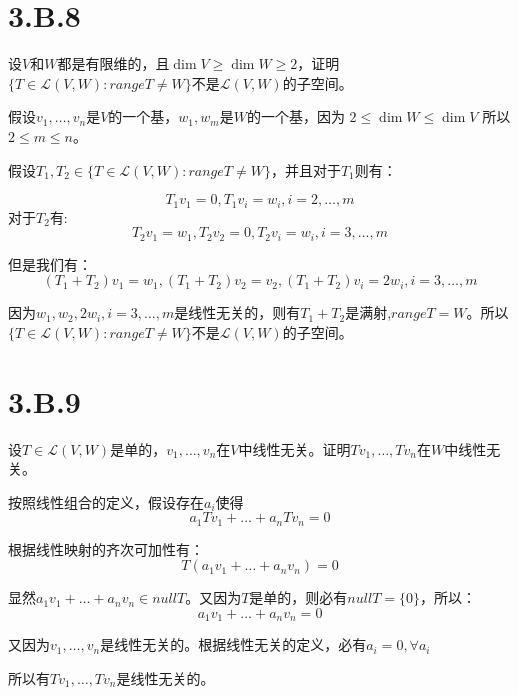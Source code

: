 \documentclass[10pt,a4paper,UTF8]{article}
\begin{document}
\section{3.B.8}
\label{sec:orgcf3ce95}


\begin{problem}
设\(V\)和\(W\)都是有限维的，且\(\dim V \geq \dim W \geq 2\)，证明\(\{T\in \mathcal{L}(V,W): range T \neq W\}\)不是\(\mathcal{L}(V,W)\)的子空间。
\end{problem}

\begin{answer}
假设\(v_{1},\ldots ,v_{n}\)是\(V\)的一个基，\(w_{1},w_{m}\)是\(W\)的一个基，因为 \(2\leq \dim W \leq \dim V\) 所以\(2\leq m \leq n\)。

假设\(T_{1},T_{2}\in \{T\in \mathcal{L}(V,W): range T \neq W\}\)，并且对于\(T_{1}\)则有：

\begin{equation}
\label{eq:12}
T_{1}v_{1} = 0, T_{1}v_{i} = w_{i}, i = 2,\ldots ,m
\end{equation}
对于\(T_{2}\)有:
\begin{equation}
\label{eq:13}
T_{2}v_{1} = w_{1}, T_{2}v_{2} = 0, T_{2}v_{i}= w_{i}, i = 3,\ldots ,m
\end{equation}

但是我们有：
\begin{equation}
\label{eq:14}
(T_{1} + T_{2}) v_{1} = w_{1}, (T_{1} + T_{2}) v_{2} = v_{2}, (T_{1} + T_{2})v_{i} = 2w_{i}, i = 3,\ldots ,m
\end{equation}


因为\(w_{1},w_{2},2w_{i},i=3,\ldots ,m\)是线性无关的，则有\(T_{1}+T_{2}\)是满射,\(rangeT = W\)。所以\(\{T\in \mathcal{L}(V,W): range T \neq W\}\)不是\(\mathcal{L}(V,W)\)的子空间。
\end{answer}
\section{3.B.9}
\label{sec:org2029a39}


\begin{problem}
设\(T\in \mathcal{L}(V,W)\)是单的，\(v_{1},\ldots ,v_{n}\)在\(V\)中线性无关。证明\(Tv_{1},\ldots ,Tv_{n}\)在\(W\)中线性无关。
\end{problem}

\begin{answer}
按照线性组合的定义，假设存在\(a_{i}\)使得\[a_{1}Tv_{1} + \ldots + a_{n}Tv_{n} = 0\]

根据线性映射的齐次可加性有：
\[T(a_{1}v_{1} + \ldots + a_{n}v_{n}) = 0\]

显然\(a_{1}v_{1} + \ldots + a_{n}v_{n} \in nullT\)。又因为\(T\)是单的，则必有\(nullT = \{0\}\)，所以：
\[a_{1}v_{1} + \ldots + a_{n}v_{n} = 0\]

又因为\(v_{1},\ldots ,v_{n}\)是线性无关的。根据线性无关的定义，必有\(a_{i}=0, \forall a_{i}\)

所以有\(Tv_{1},\ldots ,Tv_{n}\)是线性无关的。
\end{answer}
\end{document}
